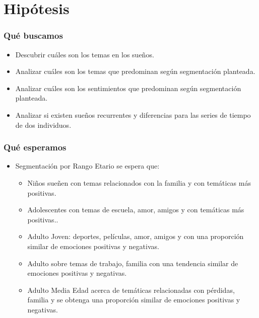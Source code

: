 \documentclass{beamer}
\begin{document}
\section{Hipótesis}
\begin{frame}
\frametitle{Qué buscamos}
\begin{itemize}
[triangle]
	\item Descubrir cuáles son los temas en los sueños.
	\item Analizar cuáles son los temas que predominan según segmentación planteada.
	\item Analizar cuáles son los sentimientos que predominan según segmentación planteada.
	\item Analizar si existen sueños recurrentes y diferencias para las series de tiempo de dos individuos.
\end{itemize}
\end{frame}
\begin{frame}
\frametitle{Qué esperamos}
\begin{itemize}
[triangle]
    \item Segmentación por Rango Etario se espera que:
    \begin{itemize}
	[circle]
        \item Niños sueñen con temas relacionados con la familia y con temáticas más positivas.
        \item Adolescentes con temas de escuela, amor, amigos  y con temáticas más positivas..
        \item Adulto Joven: deportes, películas, amor, amigos y con una proporción similar de emociones positivas y negativas.
        \item Adulto sobre temas de trabajo, familia con una tendencia similar de emociones positivas y negativas.
        \item Adulto Media Edad acerca de temáticas relacionadas con pérdidas, familia y se obtenga una proporción similar de emociones positivas y negativas.
    \end{itemize}
\end{itemize}
\end{frame}
\end{document}
